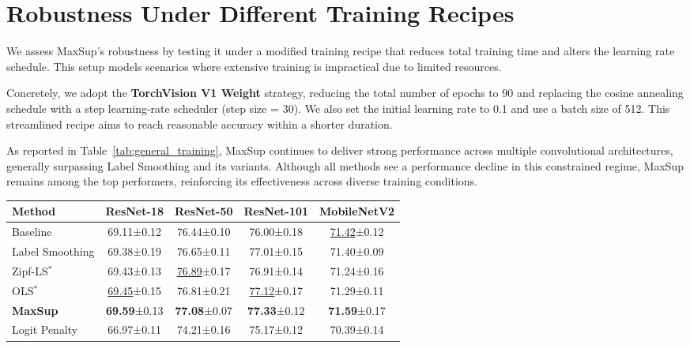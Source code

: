 \section{Robustness Under Different Training Recipes}
\label{app:training}
We assess MaxSup’s robustness by testing it under a modified training recipe that reduces total training time and alters the learning rate schedule. This setup models scenarios where extensive training is impractical due to limited resources.

Concretely, we adopt the \textbf{TorchVision V1 Weight} strategy, reducing the total number of epochs to 90 and replacing the cosine annealing schedule with a step learning-rate scheduler (step size = 30). We also set the initial learning rate to 0.1 and use a batch size of 512. This streamlined recipe aims to reach reasonable accuracy within a shorter duration.

As reported in Table~\ref{tab:general_training}, MaxSup continues to deliver strong performance across multiple convolutional architectures, generally surpassing Label Smoothing and its variants. Although all methods see a performance decline in this constrained regime, MaxSup remains among the top performers, reinforcing its effectiveness across diverse training conditions.



\begin{table*}[htbp]
\setlength{\tabcolsep}{4pt}
\centering
\scriptsize
\caption{Performance comparison on ImageNet for various convolutional neural network architectures. 
Results are presented as ``mean ± std'' (percentage). 
\textbf{Bold} and \underline{underlined} entries indicate best and second-best, respectively. 
($^{*}$: implementation details adapted from the official repositories.)}
\label{tab:general_training}
\begin{tabular}{@{}lcccc@{}}
\toprule
\textbf{Method} 
& \textbf{ResNet-18} 
& \textbf{ResNet-50} 
& \textbf{ResNet-101} 
& \textbf{MobileNetV2} \\
\midrule
Baseline 
& 69.11±0.12 
& 76.44±0.10  
& 76.00±0.18 
& \underline{71.42}±0.12 \\
Label Smoothing 
& 69.38±0.19 
& 76.65±0.11 
& 77.01±0.15 
& 71.40±0.09 \\
Zipf-LS$^{*}$ 
& 69.43±0.13 
& \underline{76.89}±0.17  
& 76.91±0.14 
& 71.24±0.16 \\
OLS$^{*}$ 
& \underline{69.45}±0.15 
& 76.81±0.21  
& \underline{77.12}±0.17 
& 71.29±0.11 \\
\textbf{MaxSup} 
& \textbf{69.59}±0.13 
& \textbf{77.08}±0.07 
& \textbf{77.33}±0.12 
& \textbf{71.59}±0.17 \\
Logit Penalty 
& 66.97±0.11 
& 74.21±0.16 
& 75.17±0.12 
& 70.39±0.14 \\
\bottomrule
\end{tabular}
\end{table*}


